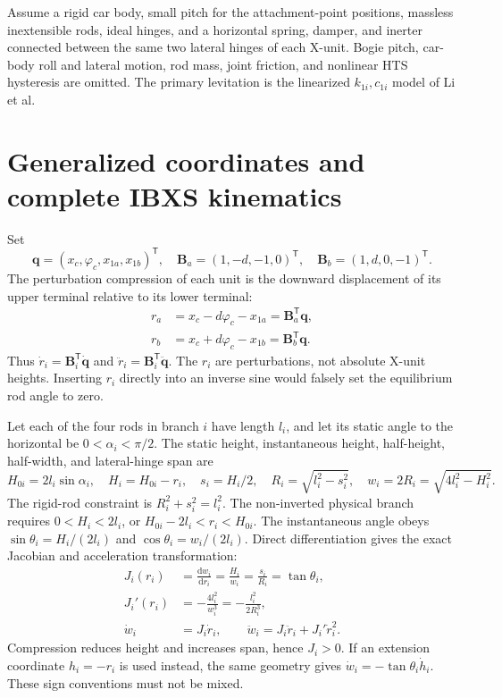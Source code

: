 \documentclass[a4paper,11pt]{article}
\numberwithin{equation}{section}
\newcommand{\bq}{\bm q}
\newcommand{\bB}{\bm B}
\newcommand{\dd}{\mathrm d}
\newcommand{\T}{\mathsf T}
\begin{document}
Assume a rigid car body, small pitch for the attachment-point positions, massless inextensible rods, ideal hinges, and a horizontal spring, damper, and inerter connected between the same two lateral hinges of each X-unit. Bogie pitch, car-body roll and lateral motion, rod mass, joint friction, and nonlinear HTS hysteresis are omitted. The primary levitation is the linearized $k_{1i},c_{1i}$ model of Li et al.

\section{Generalized coordinates and complete IBXS kinematics}
Set
\begin{equation}
\bq=(x_c,\varphi_c,x_{1a},x_{1b})^\T,
\quad \bB_a=(1,-d,-1,0)^\T,
\quad \bB_b=(1,d,0,-1)^\T.\label{eq:B}
\end{equation}
The perturbation compression of each unit is the downward displacement of its upper terminal relative to its lower terminal:
\begin{align}
r_a&=x_c-d\varphi_c-x_{1a}=\bB_a^\T\bq,\label{eq:ra}\\
r_b&=x_c+d\varphi_c-x_{1b}=\bB_b^\T\bq.\label{eq:rb}
\end{align}
Thus $\dot r_i=\bB_i^\T\dot{\bq}$ and $\ddot r_i=\bB_i^\T\ddot{\bq}$. The $r_i$ are perturbations, not absolute X-unit heights. Inserting $r_i$ directly into an inverse sine would falsely set the equilibrium rod angle to zero.

Let each of the four rods in branch $i$ have length $l_i$, and let its static angle to the horizontal be $0<\alpha_i<\pi/2$. The static height, instantaneous height, half-height, half-width, and lateral-hinge span are
\begin{equation}
H_{0i}=2l_i\sin\alpha_i,\quad H_i=H_{0i}-r_i,\quad
s_i=H_i/2,\quad R_i=\sqrt{l_i^2-s_i^2},\quad
w_i=2R_i=\sqrt{4l_i^2-H_i^2}.\label{eq:geom}
\end{equation}
The rigid-rod constraint is $R_i^2+s_i^2=l_i^2$. The non-inverted physical branch requires $0<H_i<2l_i$, or $H_{0i}-2l_i<r_i<H_{0i}$. The instantaneous angle obeys $\sin\theta_i=H_i/(2l_i)$ and $\cos\theta_i=w_i/(2l_i)$. Direct differentiation gives the exact Jacobian and acceleration transformation:
\begin{align}
J_i(r_i)&=\frac{\dd w_i}{\dd r_i}=\frac{H_i}{w_i}=\frac{s_i}{R_i}=\tan\theta_i,\label{eq:J}\\
J_i'(r_i)&=-\frac{4l_i^2}{w_i^3}=-\frac{l_i^2}{2R_i^3},\label{eq:Jp}\\
\dot w_i&=J_i\dot r_i,\qquad
\ddot w_i=J_i\ddot r_i+J_i'\dot r_i^2.\label{eq:wdd}
\end{align}
Compression reduces height and increases span, hence $J_i>0$. If an extension coordinate $h_i=-r_i$ is used instead, the same geometry gives $\dot w_i=-\tan\theta_i\dot h_i$. These sign conventions must not be mixed.
\end{document}
